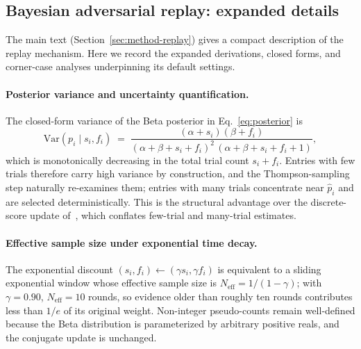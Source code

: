 \documentclass{article}
\begin{document}
\subsection{Bayesian adversarial replay: expanded details}
\label{apdx:bayesian-replay}

The main text (Section~\ref{sec:method-replay}) gives a compact description of the replay mechanism. Here we record the expanded derivations, closed forms, and corner-case analyses underpinning its default settings.

\paragraph{Posterior variance and uncertainty quantification.}
The closed-form variance of the Beta posterior in Eq.~\ref{eq:posterior} is
\begin{equation}
  \mathrm{Var}(p_i \mid s_i, f_i) \;=\; \frac{(\alpha+s_i)(\beta+f_i)}{(\alpha+\beta+s_i+f_i)^2\,(\alpha+\beta+s_i+f_i + 1)},
  \label{eq:posterior-var}
\end{equation}
which is monotonically decreasing in the total trial count $s_i+f_i$. Entries with few trials therefore carry high variance by construction, and the Thompson-sampling step naturally re-examines them; entries with many trials concentrate near $\hat p_i$ and are selected deterministically. This is the structural advantage over the discrete-score update of~\citet{ssp2026}, which conflates few-trial and many-trial estimates.

\paragraph{Effective sample size under exponential time decay.}
The exponential discount $(s_i, f_i)\leftarrow(\gamma s_i, \gamma f_i)$ is equivalent to a sliding exponential window whose effective sample size is $N_{\mathrm{eff}} = 1/(1-\gamma)$; with $\gamma=0.90$, $N_{\mathrm{eff}}=10$ rounds, so evidence older than roughly ten rounds contributes less than $1/e$ of its original weight. Non-integer pseudo-counts remain well-defined because the Beta distribution is parameterized by arbitrary positive reals, and the conjugate update is unchanged.
\end{document}
